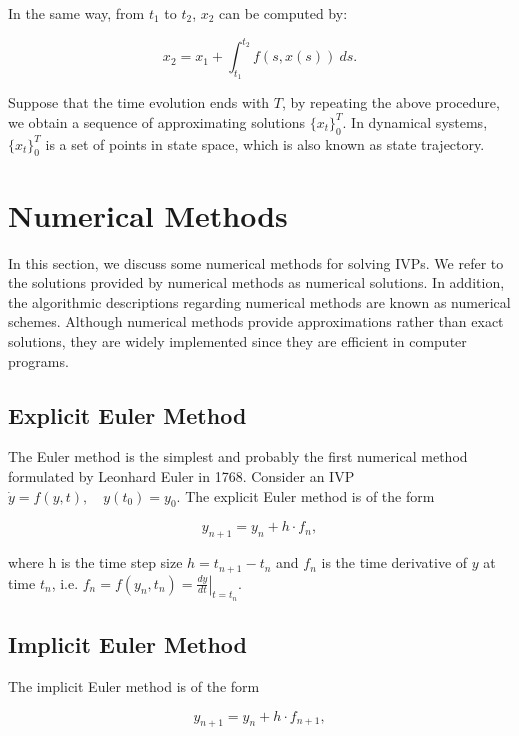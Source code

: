 \documentclass[
	parskip, 			   %
	twoside, 			   %
	DIV=14, 			   %
	BCOR=15.0mm, 		   %
	headsepline, 		   %
	open=right, 		   %
	captions=tableheading, %
	bibliography=totoc,    %
	numbers=noenddot       %
]{scrreprt}
\begin{document}
In the same way, from $t_{1}$ to $t_{2}$, $x_{2}$ can be computed by:

\begin{equation}
    \label{eq:solution_IVP_second_step}
    x_{2} = x_{1} + \int_{t_{1}}^{t_{2}} f(s, x(s))\:ds.
\end{equation}

Suppose that the time evolution ends with $T$, by repeating the above procedure, we obtain a sequence of approximating solutions $ \{ x_t \}_{0}^{T}$. In dynamical systems, $\{ x_t \}_{0}^{T}$ is a  set of points in state space, which is also known as state trajectory.


\clearpage
\section{Numerical Methods}
In this section, we discuss some numerical methods for solving IVPs. We refer to the solutions provided by numerical methods as numerical solutions. In addition, the algorithmic descriptions regarding numerical methods are known as numerical schemes. Although numerical methods provide approximations rather than exact solutions, they are widely implemented since they are efficient in computer programs. 

\subsection{Explicit Euler Method}
The Euler method is the simplest and probably the first numerical method formulated by Leonhard Euler in 1768. Consider an IVP $\dot{y} = f(y, t), \quad y(t_{0})=y_{0}$. The explicit Euler method is of the form

\begin{equation}
    \label{eq:Eulers_method_explicit}
    y_{n+1} = y_{n} + h \cdot f_{n},
\end{equation}

where h is the time step size $h = t_{n+1} - t_{n}$ and $f_{n}$ is the time derivative of $y$ at time $t_{n}$, i.e. $f_{n} = f(y_n, t_n) = \left. \frac{dy}{dt} \right|_{t=t_n}$.

\subsection{Implicit Euler Method}
The implicit Euler method is of the form

\begin{equation}
    \label{eq:Eulers_method_implicit}
    y_{n+1} = y_{n} + h \cdot f_{n+1},
\end{equation}
\end{document}
